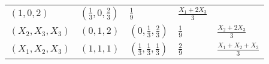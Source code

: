 \documentclass[]{book}
\theoremstyle{break}
\theoremstyle{definition}
\theoremstyle{definition}
\theoremstyle{definition}
\theoremstyle{remark}
\begin{document}
\begin{longtable}[]{@{}lllll@{}}
\begin{minipage}[t]{0.16\columnwidth}
\(\left( 1,0,2 \right)\)\strut
\end{minipage} & \begin{minipage}[t]{0.16\columnwidth}\raggedright\strut
\(\left( \frac{1}{3},0,\frac{2}{3} \right)\)\strut
\end{minipage} & \begin{minipage}[t]{0.17\columnwidth}\raggedright\strut
\(\frac{1}{9}\)\strut
\end{minipage} & \begin{minipage}[t]{0.18\columnwidth}\raggedright\strut
\(\frac{X_1+2X_3}{3}\)\strut
\end{minipage}\tabularnewline
\begin{minipage}[t]{0.18\columnwidth}\raggedright\strut
\(\left( X_2,X_3,X_3 \right)\)\strut
\end{minipage} & \begin{minipage}[t]{0.16\columnwidth}\raggedright\strut
\(\left( 0,1,2 \right)\)\strut
\end{minipage} & \begin{minipage}[t]{0.16\columnwidth}\raggedright\strut
\(\left( 0,\frac{1}{3},\frac{2}{3} \right)\)\strut
\end{minipage} & \begin{minipage}[t]{0.17\columnwidth}\raggedright\strut
\(\frac{1}{9}\)\strut
\end{minipage} & \begin{minipage}[t]{0.18\columnwidth}\raggedright\strut
\(\frac{X_2+2X_3}{3}\)\strut
\end{minipage}\tabularnewline
\begin{minipage}[t]{0.18\columnwidth}\raggedright\strut
\(\left( X_1,X_2,X_3 \right)\)\strut
\end{minipage} & \begin{minipage}[t]{0.16\columnwidth}\raggedright\strut
\(\left( 1,1,1 \right)\)\strut
\end{minipage} & \begin{minipage}[t]{0.16\columnwidth}\raggedright\strut
\(\left( \frac{1}{3},\frac{1}{3},\frac{1}{3} \right)\)\strut
\end{minipage} & \begin{minipage}[t]{0.17\columnwidth}\raggedright\strut
\(\frac{2}{9}\)\strut
\end{minipage} & \begin{minipage}[t]{0.18\columnwidth}\raggedright\strut
\(\frac{X_1+X_2+X_3}{3}\)\strut
\end{minipage}\tabularnewline
\bottomrule
\end{longtable}
\end{document}
